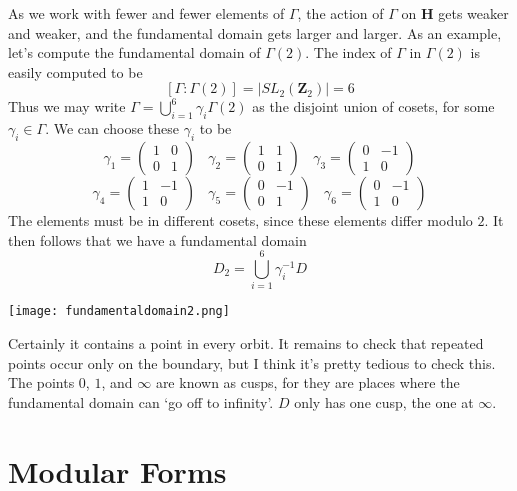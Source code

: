 As we work with fewer and fewer elements of $\Gamma$, the action of $\Gamma$ on $\mathbf{H}$ gets weaker and weaker, and the fundamental domain gets larger and larger. As an example, let's compute the fundamental domain of $\Gamma(2)$. The index of $\Gamma$ in $\Gamma(2)$ is easily computed to be
%
\[ [\Gamma: \Gamma(2)] = |SL_2(\mathbf{Z}_2)| = 6 \]
%
Thus we may write $\Gamma = \bigcup_{i = 1}^6 \gamma_i \Gamma(2)$ as the disjoint union of cosets, for some $\gamma_i \in \Gamma$. We can choose these $\gamma_i$ to be
%
\[ \gamma_1 =  \begin{pmatrix} 1 & 0 \\ 0 & 1 \end{pmatrix}\ \ \ \ \gamma_2 =  \begin{pmatrix} 1 & 1 \\ 0 & 1 \end{pmatrix}\ \ \ \ \gamma_3 =  \begin{pmatrix} 0 & -1 \\ 1 & 0 \end{pmatrix} \]
\[ \gamma_4 =  \begin{pmatrix} 1 & -1 \\ 1 & 0 \end{pmatrix}\ \ \ \ \gamma_5 =  \begin{pmatrix} 0 & -1 \\ 0 & 1 \end{pmatrix}\ \ \ \ \gamma_6 =  \begin{pmatrix} 0 & -1 \\ 1 & 0 \end{pmatrix} \]
%
The elements must be in different cosets, since these elements differ modulo $2$. It then follows that we have a fundamental domain
%
\[ D_2 = \bigcup_{i = 1}^6 \gamma_i^{-1} D \]
%
\begin{center}
\texttt{[image: fundamentaldomain2.png]}
\end{center}
%
Certainly it contains a point in every orbit. It remains to check that repeated points occur only on the boundary, but I think it's pretty tedious to check this. The points $0$, $1$, and $\infty$ are known as cusps, for they are places where the fundamental domain can `go off to infinity'. $D$ only has one cusp, the one at $\infty$.

\section{Modular Forms}

